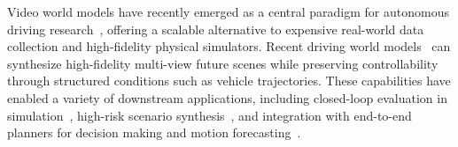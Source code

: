 \documentclass[runningheads]{llncs}
\begin{document}


Video world models have recently emerged as a central paradigm for autonomous driving research~\cite{bruce2024genie,guo2025dist,ali2025world,gao2024enhance,hu2022model,hu2023gaia}, offering a scalable alternative to expensive real-world data collection and high-fidelity physical simulators.
Recent driving world models~\cite{gao2025magicdrive,zhao2025drivedreamer2,guo2025genesis,wen2024panacea,chen2026vilta,chen2025unimlvg,zeng2025rethinking} can synthesize high-fidelity multi-view future scenes while preserving controllability through structured conditions such as vehicle trajectories.
These capabilities have enabled a variety of downstream applications, including closed-loop evaluation in simulation~\cite{yang2025drivearena,yan2025drivingsphere}, high-risk scenario synthesis~\cite{zhou2025safemvdrive,xu2025challenger}, and integration with end-to-end planners for decision making and motion forecasting~\cite{zeng2025futuresightdrive,shi2025drivex,xia2025drivelaw,li2025recogdrive}.
\end{document}

